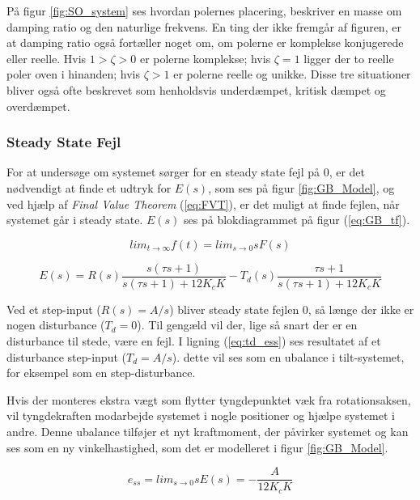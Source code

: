 På figur \ref{fig:SO_system} ses hvordan polernes placering, beskriver en masse om damping ratio og den naturlige frekvens. En ting der ikke fremgår af figuren, er at damping ratio også fortæller noget om, om polerne er komplekse konjugerede eller reelle. Hvis $1>\zeta>0$ er polerne komplekse; hvis $\zeta=1$ ligger der to reelle poler oven i hinanden; hvis $\zeta>1$ er polerne reelle og unikke. Disse tre situationer bliver også ofte beskrevet som henholdsvis underdæmpet, kritisk dæmpet og overdæmpet.




\subsubsection{Steady State Fejl}

For at undersøge om systemet sørger for en steady state fejl på 0, er det nødvendigt at finde et udtryk for $E(s)$, som ses på figur \ref{fig:GB_Model}, og ved hjælp af \textit{Final Value Theorem} (\ref{eq:FVT}), er det muligt at finde fejlen, når systemet går i steady state. $E(s)$ ses på blokdiagrammet på figur (\ref{eq:GB_tf}).

\begin{equation} \label{eq:FVT}
lim_{t \to \infty} f(t) = lim_{s \to 0} sF(s)
\end{equation}

\begin{equation} \label{eq:ess}
E(s)=R(s)\frac{s(\tau s+1)}{s(\tau s+1)+12K_{c}K}-T_{d}(s)\frac{\tau s+1}{s(\tau s+1)+12K_{c}K}
\end{equation}

Ved et step-input ($R(s)=A/s$) bliver steady state fejlen 0, så længe der ikke er nogen disturbance ($T_{d}=0$). Til gengæld vil der, lige så snart der er en disturbance til stede, være en fejl. I ligning (\ref{eq:td_ess}) ses resultatet af et disturbance step-input ($T_{d}=A/s$). dette vil ses som en ubalance i tilt-systemet, for eksempel som en step-disturbance.

Hvis der monteres ekstra vægt som flytter tyngdepunktet væk fra rotationsaksen, vil tyngdekraften modarbejde systemet i nogle positioner og hjælpe systemet i andre. Denne ubalance tilføjer et nyt kraftmoment, der påvirker systemet og kan ses som en ny vinkelhastighed, som det er modelleret i figur \ref{fig:GB_Model}.

\begin{equation}\label{eq:td_ess}
e_{ss}=lim_{s \to 0} sE(s)=-\frac{A}{12K_{c}K}
\end{equation}

